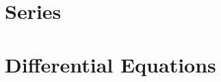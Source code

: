 \documentclass[letterpaper]{memoir}
\def\chaptertwo{Series}
\def\chapterthree{Differential Equations}
\begin{document}
 \chapter{\chaptertwo}
 \clearpage

 

 



 

 
 
















 \chapter{\chapterthree}
 \clearpage
 







 

 

 

 

 
 





\end{document}
